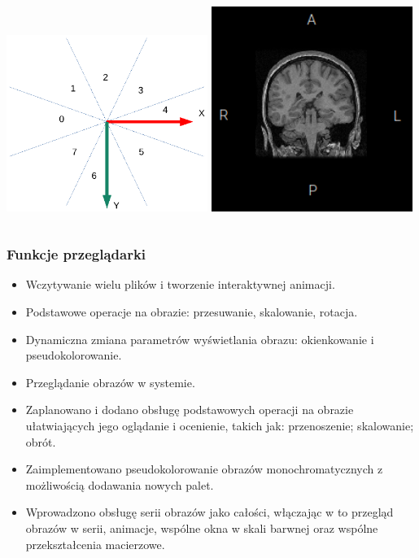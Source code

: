 \documentclass[aspectratio=169]{beamer}
\begin{document}
\begin{frame}[t]
\begin{columns}[t]
        \includegraphics[width=0.49\textwidth]{img/imageorientationindicator-004.pdf}
        \includegraphics[width=0.49\textwidth]{img/imageorientationindicator-005.png}
    \end{columns}
\end{frame}

\begin{frame}
    \frametitle{Funkcje przeglądarki}
    \begin{itemize}
        \item Wczytywanie wielu plików i tworzenie interaktywnej animacji.
        \item Podstawowe operacje na obrazie: przesuwanie, skalowanie, rotacja.
        \item Dynamiczna zmiana parametrów wyświetlania obrazu: okienkowanie i pseudokolorowanie.
        \item Przeglądanie obrazów w systemie.
        \item Zaplanowano i dodano obsługę podstawowych operacji na obrazie ułatwiających jego oglądanie i ocenienie, takich jak: przenoszenie; skalowanie; obrót.
        \item Zaimplementowano pseudokolorowanie obrazów monochromatycznych z możliwością dodawania nowych palet.
        \item Wprowadzono obsługę serii obrazów jako całości, włączając w to przegląd obrazów w serii, animacje, wspólne okna w skali barwnej oraz wspólne przekształcenia macierzowe.
    \end{itemize}
\end{frame}
\end{document}
